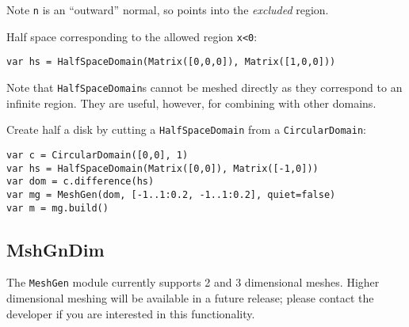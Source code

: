 Note \texttt{n} is an ``outward'' normal, so points into the
\emph{excluded} region.

Half space corresponding to the allowed region \texttt{x\textless{}0}:

\begin{lstlisting}
var hs = HalfSpaceDomain(Matrix([0,0,0]), Matrix([1,0,0]))
\end{lstlisting}

Note that \texttt{HalfSpaceDomain}s cannot be meshed directly as they
correspond to an infinite region. They are useful, however, for
combining with other domains.

Create half a disk by cutting a \texttt{HalfSpaceDomain} from a
\texttt{CircularDomain}:

\begin{lstlisting}
var c = CircularDomain([0,0], 1)
var hs = HalfSpaceDomain(Matrix([0,0]), Matrix([-1,0]))
var dom = c.difference(hs) 
var mg = MeshGen(dom, [-1..1:0.2, -1..1:0.2], quiet=false)
var m = mg.build()
\end{lstlisting}

\hypertarget{mshgndim}{%
\subsection{MshGnDim}\label{mshgndim}}

The \texttt{MeshGen} module currently supports 2 and 3 dimensional
meshes. Higher dimensional meshing will be available in a future
release; please contact the developer if you are interested in this
functionality.
